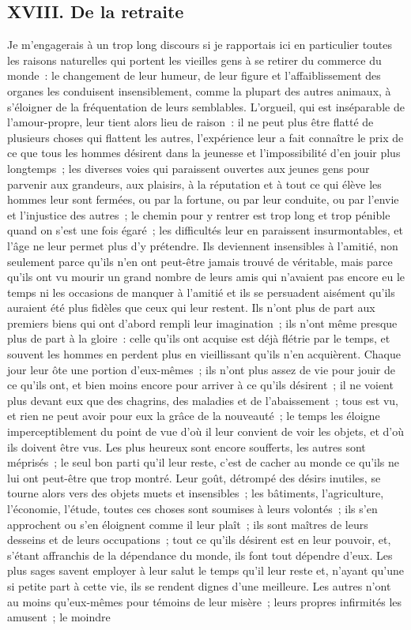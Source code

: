\documentclass[french,twoside]{book} %
\begin{document}
\subsection[{XVIII. De la retraite}]{XVIII. De la retraite}
\noindent Je m’engagerais à un trop long discours si je rapportais ici en particulier toutes les raisons naturelles qui portent les vieilles gens à se retirer du commerce du monde : le changement de leur humeur, de leur figure et l’affaiblissement des organes les conduisent insensiblement, comme la plupart des autres animaux, à s’éloigner de la fréquentation de leurs semblables. L’orgueil, qui est inséparable de l’amour-propre, leur tient alors lieu de raison : il ne peut plus être flatté de plusieurs choses qui flattent les autres, l’expérience leur a fait connaître le prix de ce que tous les hommes désirent dans la jeunesse et l’impossibilité d’en jouir plus longtemps ; les diverses voies qui paraissent ouvertes aux jeunes gens pour parvenir aux grandeurs, aux plaisirs, à la réputation et à tout ce qui élève les hommes leur sont fermées, ou par la fortune, ou par leur conduite, ou par l’envie et l’injustice des autres ; le chemin pour y rentrer est trop long et trop pénible quand on s’est une fois égaré ; les difficultés leur en paraissent insurmontables, et l’âge ne leur permet plus d’y prétendre. Ils deviennent insensibles à l’amitié, non seulement parce qu’ils n’en ont peut-être jamais trouvé de véritable, mais parce qu’ils ont vu mourir un grand nombre de leurs amis qui n’avaient pas encore eu le temps ni les occasions de manquer à l’amitié et ils se persuadent aisément qu’ils auraient été plus fidèles que ceux qui leur restent. Ils n’ont plus de part aux premiers biens qui ont d’abord rempli leur imagination ; ils n’ont même presque plus de part à la gloire : celle qu’ils ont acquise est déjà flétrie par le temps, et souvent les hommes en perdent plus en vieillissant qu’ils n’en acquièrent. Chaque jour leur ôte une portion d’eux-mêmes ; ils n’ont plus assez de vie pour jouir de ce qu’ils ont, et bien moins encore pour arriver à ce qu’ils désirent ; il ne voient plus devant eux que des chagrins, des maladies et de l’abaissement ; tous est vu, et rien ne peut avoir pour eux la grâce de la nouveauté ; le temps les éloigne imperceptiblement du point de vue d’où il leur convient de voir les objets, et d’où ils doivent être vus. Les plus heureux sont encore soufferts, les autres sont méprisés ; le seul bon parti qu’il leur reste, c’est de cacher au monde ce qu’ils ne lui ont peut-être que trop montré. Leur goût, détrompé des désirs inutiles, se tourne alors vers des objets muets et insensibles ; les bâtiments, l’agriculture, l’économie, l’étude, toutes ces choses sont soumises à leurs volontés ; ils s’en approchent ou s’en éloignent comme il leur plaît ; ils sont maîtres de leurs desseins et de leurs occupations ; tout ce qu’ils désirent est en leur pouvoir, et, s’étant affranchis de la dépendance du monde, ils font tout dépendre d’eux. Les plus sages savent employer à leur salut le temps qu’il leur reste et, n’ayant qu’une si petite part à cette vie, ils se rendent dignes d’une meilleure. Les autres n’ont au moins qu’eux-mêmes pour témoins de leur misère ; leurs propres infirmités les amusent ; le moindre 
\end{document}
